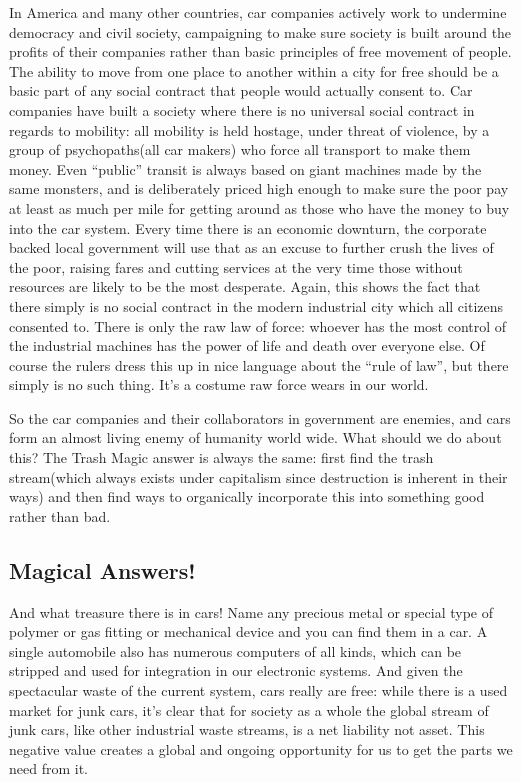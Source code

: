 In America and many other countries, car companies actively work to
undermine democracy and civil society, campaigning to make sure society
is built around the profits of their companies rather than basic
principles of free movement of people. The ability to move from one
place to another within a city for free should be a basic part of any
social contract that people would actually consent to. Car companies
have built a society where there is no universal social contract in
regards to mobility: all mobility is held hostage, under threat of
violence, by a group of psychopaths(all car makers) who force all
transport to make them money. Even ``public'' transit is always based on
giant machines made by the same monsters, and is deliberately priced
high enough to make sure the poor pay at least as much per mile for
getting around as those who have the money to buy into the car system.
Every time there is an economic downturn, the corporate backed local
government will use that as an excuse to further crush the lives of the
poor, raising fares and cutting services at the very time those without
resources are likely to be the most desperate. Again, this shows the
fact that there simply is no social contract in the modern industrial
city which all citizens consented to. There is only the raw law of
force: whoever has the most control of the industrial machines has the
power of life and death over everyone else. Of course the rulers dress
this up in nice language about the ``rule of law'', but there simply is
no such thing. It's a costume raw force wears in our world.

So the car companies and their collaborators in government are enemies,
and cars form an almost living enemy of humanity world wide. What should
we do about this? The Trash Magic answer is always the same: first find
the trash stream(which always exists under capitalism since destruction
is inherent in their ways) and then find ways to organically incorporate
this into something good rather than bad.

\subsection{Magical Answers!}\label{magical-answers}

And what treasure there is in cars! Name any precious metal or special
type of polymer or gas fitting or mechanical device and you can find
them in a car. A single automobile also has numerous computers of all
kinds, which can be stripped and used for integration in our electronic
systems. And given the spectacular waste of the current system, cars
really are free: while there is a used market for junk cars, it's clear
that for society as a whole the global stream of junk cars, like other
industrial waste streams, is a net liability not asset. This negative
value creates a global and ongoing opportunity for us to get the parts
we need from it.

